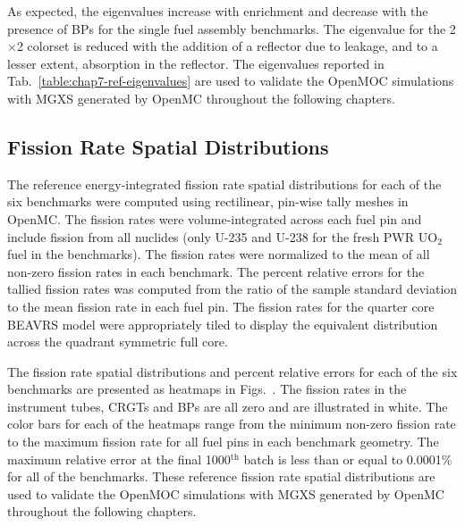 \footnotemark


As expected, the eigenvalues increase with enrichment and decrease with the presence of \acp{BP} for the single fuel assembly benchmarks. The eigenvalue for the 2$\times$2 colorset is reduced with the addition of a reflector due to leakage, and to a lesser extent, absorption in the reflector. The eigenvalues reported in Tab.~\ref{table:chap7-ref-eigenvalues} are used to validate the OpenMOC simulations with \ac{MGXS} generated by OpenMC throughout the following chapters.

\subsection{Fission Rate Spatial Distributions}
\label{subsec:chap7-pin-powers}

The reference energy-integrated fission rate spatial distributions for each of the six benchmarks were computed using rectilinear, pin-wise tally meshes in OpenMC. The fission rates were volume-integrated across each fuel pin and include fission from all nuclides (only U-235 and U-238 for the fresh \ac{PWR} UO$_2$ fuel in the benchmarks). The fission rates were normalized to the mean of all non-zero fission rates in each benchmark. The percent relative errors for the tallied fission rates was computed from the ratio of the sample standard deviation to the mean fission rate in each fuel pin. The fission rates for the quarter core \ac{BEAVRS} model were appropriately tiled to display the equivalent distribution across the quadrant symmetric full core.

The fission rate spatial distributions and percent relative errors for each of the six benchmarks are presented as heatmaps in Figs.~. The fission rates in the instrument tubes, \acp{CRGT} and \acp{BP} are all zero and are illustrated in white. The color bars for each of the heatmaps range from the minimum non-zero fission rate to the maximum fission rate for all fuel pins in each benchmark geometry. The maximum relative error at the final 1000$^{\text{th}}$ batch is less than or equal to 0.0001\% for all of the benchmarks. These reference fission rate spatial distributions are used to validate the OpenMOC simulations with \ac{MGXS} generated by OpenMC throughout the following chapters.


